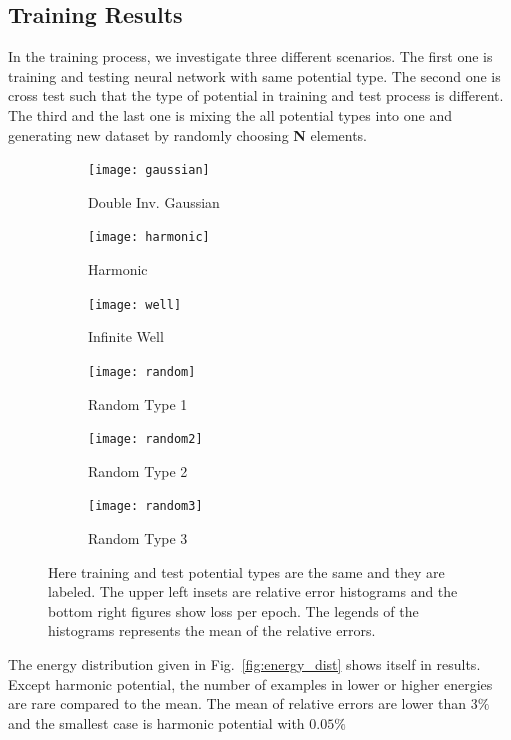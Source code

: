 \documentclass[a4paper,times,hidelinks,12pt]{article}
\begin{document}
\subsection{Training Results}
\label{sec:training_results}

In the training process, we investigate three different scenarios. The first one is training and testing neural network with same potential type. The second one is cross test such that the type of potential in training and test process is different. The third and the last one is mixing the all potential types into one and generating new dataset by randomly choosing \textbf{N} elements.

\graphicspath{{"../figs/training/"}}
\begin{figure}[H]
    \centering
    \begin{subfigure}[t]{0.49\textwidth}
        \texttt{[image: gaussian]}
    \caption{Double Inv. Gaussian}
    \end{subfigure}
    \begin{subfigure}[t]{0.49\textwidth}
        \texttt{[image: harmonic]}
    \caption{Harmonic}
    \end{subfigure}
    \begin{subfigure}[t]{0.49\textwidth}
        \texttt{[image: well]}
        \caption{Infinite Well}
    \end{subfigure}
    \begin{subfigure}[t]{0.49\textwidth}
        \texttt{[image: random]}
        \caption{Random Type 1}
    \end{subfigure}
    \begin{subfigure}[t]{0.49\textwidth}
        \texttt{[image: random2]}
        \caption{Random Type 2}
    \end{subfigure}
    \begin{subfigure}[t]{0.49\textwidth}
        \texttt{[image: random3]}
        \caption{Random Type 3}
    \end{subfigure}
\caption{Here training and test potential types are the same and they are labeled. The upper left insets are relative error histograms and the bottom right figures show loss per epoch. The legends of the histograms represents the mean of the relative errors.}
\label{fig:training_results}
\end{figure}

The energy distribution given in Fig.~\ref{fig:energy_dist} shows itself in results. Except harmonic potential, the number of examples in lower or higher energies are rare compared to the mean. The mean of relative errors are lower than $3\%$ and the smallest case is harmonic potential with $0.05\%$
\end{document}
